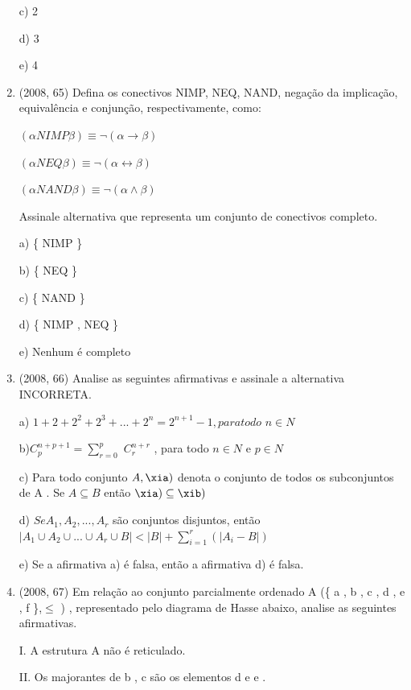 \documentclass{article}
\begin{document}
\begin{enumerate}
c) 2

d) 3

e) 4\newline



\item(2008, 65) Defina os conectivos NIMP, NEQ, NAND, negação da implicação, equivalência e conjunção, respectivamente, como:

$(\alpha NIMP \beta) \equiv \lnot(\alpha \rightarrow \beta)$

$(\alpha NEQ \beta) \equiv \lnot(\alpha \leftrightarrow \beta)$

$(\alpha NAND \beta) \equiv \lnot(\alpha \land \beta)$

Assinale alternativa que representa um conjunto de conectivos completo.

a) \{ NIMP \}

b) \{ NEQ \}

c) \{ NAND \}

d) \{ NIMP , NEQ \}

e) Nenhum é completo\newline




\item(2008, 66) Analise as seguintes afirmativas e assinale a alternativa INCORRETA.

a) $1 + 2 + 2^2 + 2^3 + ... + 2^n = 2^{n+1} - 1 , para todo$ $n \in N$

b)$C_p^{n+p+1} =\sum_{r=0}^p$ $C_r^{n+r}$ , para todo $n \in N$ e $p \in N$  

c) Para todo conjunto $A , \xia)$ denota o conjunto de todos os subconjuntos de A . Se $A \subseteq B $ então $\xia)  \subseteq  \xib)$

d) $Se A_1 , A_2 ,..., A_r$ são conjuntos disjuntos, então $|A_1\cup A_2\cup ...\cup A_r\cup B|<|B|+\sum_{i=1}^{r}(|A_i -B|)$

e) Se a afirmativa a) é falsa, então a afirmativa d) é falsa.\newline





\item(2008, 67) Em relação ao conjunto parcialmente ordenado A (\{ a , b , c , d , e , f \},$\leq$ ) , representado pelo diagrama de Hasse abaixo, analise as seguintes afirmativas.

I. A estrutura A não é reticulado.

II. Os majorantes de { b , c } são os elementos d e e .


\end{enumerate}
\end{document}
